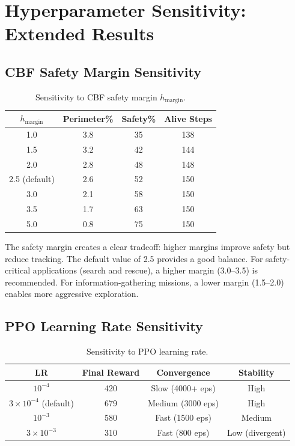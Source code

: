\documentclass[12pt,a4paper]{article}
\begin{document}
\section{Hyperparameter Sensitivity: Extended Results}
\label{app:sensitivity_extended}

\subsection{CBF Safety Margin Sensitivity}

\begin{table}[t]
\centering
\caption{Sensitivity to CBF safety margin $h_{\text{margin}}$.}
\label{tab:cbf_margin}
\begin{tabular}{cccc}
\toprule
\textbf{$h_{\text{margin}}$} & \textbf{Perimeter\%} & \textbf{Safety\%} & \textbf{Alive Steps} \\
\midrule
1.0 & 3.8 & 35 & 138 \\
1.5 & 3.2 & 42 & 144 \\
2.0 & 2.8 & 48 & 148 \\
2.5 (default) & 2.6 & 52 & 150 \\
3.0 & 2.1 & 58 & 150 \\
3.5 & 1.7 & 63 & 150 \\
5.0 & 0.8 & 75 & 150 \\
\bottomrule
\end{tabular}
\end{table}

The safety margin creates a clear tradeoff: higher margins improve safety but reduce tracking. The default value of 2.5 provides a good balance. For safety-critical applications (search and rescue), a higher margin (3.0--3.5) is recommended. For information-gathering missions, a lower margin (1.5--2.0) enables more aggressive exploration.

\subsection{PPO Learning Rate Sensitivity}

\begin{table}[t]
\centering
\caption{Sensitivity to PPO learning rate.}
\label{tab:lr_sensitivity}
\begin{tabular}{cccc}
\toprule
\textbf{LR} & \textbf{Final Reward} & \textbf{Convergence} & \textbf{Stability} \\
\midrule
$10^{-4}$ & 420 & Slow (4000+ eps) & High \\
$3 \times 10^{-4}$ (default) & 679 & Medium (3000 eps) & High \\
$10^{-3}$ & 580 & Fast (1500 eps) & Medium \\
$3 \times 10^{-3}$ & 310 & Fast (800 eps) & Low (divergent) \\
\bottomrule
\end{tabular}
\end{table}
\end{document}
